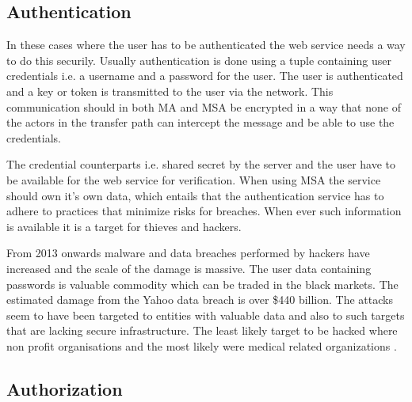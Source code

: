 \subsection{Authentication}
\begin{sloppypar}
    In these cases where the user has to be authenticated the web service needs 
    a way to do this securily. Usually authentication is done using a tuple 
    containing user credentials i.e. a username and a password for the user. The
    user is authenticated and a key or token is transmitted to the user via the 
    network. This communication should in both MA and MSA be encrypted in a way 
    that none of the actors in the transfer path can intercept the message and 
    be able to use the credentials.
\end{sloppypar}

\begin{sloppypar}
    The credential counterparts i.e. shared secret by the server and the user 
    have to be available for the web service for verification. When using MSA 
    the service should own it's own data, which entails that the authentication 
    service has to adhere to practices that minimize risks for breaches. 
    When ever such information is available it is a target for thieves and hackers.
\end{sloppypar}
    
\begin{sloppypar}
    From 2013 onwards malware and data breaches performed by hackers have 
    increased and the scale of the damage is massive. The user data containing 
    passwords is valuable commodity which can be traded in the black markets. 
    The estimated damage 
    from the Yahoo data breach is over \$440 billion. The attacks seem to have 
    been targeted to entities with valuable data and also to such targets that 
    are lacking secure infrastructure. The least likely target to be hacked 
    where non profit organisations and the most likely were medical related 
    organizations \citep{breach}.
\end{sloppypar}

\subsection{Authorization}
\begin{sloppypar}
    
\end{sloppypar}



